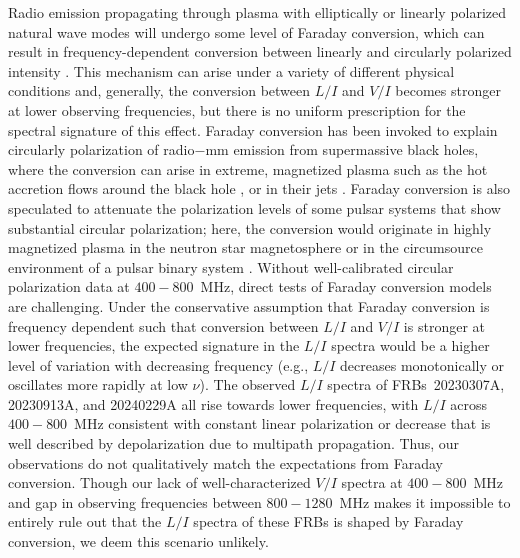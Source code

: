 \documentclass[twocolumn, linenumbers]{aastex701}
\begin{document}
Radio emission propagating through plasma with elliptically or linearly polarized natural wave modes will undergo some level of Faraday conversion, which can result in frequency-dependent conversion between linearly and circularly polarized intensity \citep{1969SvA....13..396S, 1998PASA...15..211K}. This mechanism can arise under a variety of different physical conditions \citep[e.g.,][]{2010ApJ...725.1600M, 2019ApJ...876...74G, 2019MNRAS.485L..78V, 2022ApJ...933L...6L} and, generally, the conversion between $L/I$ and $V/I$ becomes stronger at lower observing frequencies, but there is no uniform prescription for the spectral signature of this effect. Faraday conversion has been invoked to explain circularly polarization of radio$-$mm emission from supermassive black holes, where the conversion can arise in extreme, magnetized plasma such as the hot accretion flows around the black hole \citep[e.g., in Sgr A*;][]{2011MNRAS.416.2574H}, or in their jets \citep[][]{2003Ap&SS.288..143W, 2018ApJ...862...58M}. Faraday conversion is also speculated to attenuate the polarization levels of some pulsar systems that show substantial circular polarization; here, the conversion would originate in highly magnetized plasma in the neutron star magnetosphere \citep{2004A&A...421..681E, 2019MNRAS.483.2778I, 2024NatAs...8..606L} or in the circumsource environment of a pulsar binary system \citep{2023Natur.618..484L}. Without well-calibrated circular polarization data at $400-800$~MHz, direct tests of Faraday conversion models are challenging. Under the conservative assumption that Faraday conversion is frequency dependent such that conversion between $L/I$ and $V/I$ is stronger at lower frequencies, the expected signature in the $L/I$ spectra would be a higher level of variation with decreasing frequency (e.g., $L/I$ decreases monotonically or oscillates more rapidly at low $\nu$). The observed $L/I$ spectra of FRBs~20230307A, 20230913A, and 20240229A all rise towards lower frequencies, with $L/I$ across $400-800$~MHz consistent with constant linear polarization or decrease that is well described by depolarization due to multipath propagation. Thus, our observations do not qualitatively match the expectations from Faraday conversion. Though our lack of well-characterized $V/I$ spectra at $400-800$~MHz and gap in observing frequencies between $800-1280$~MHz makes it impossible to entirely rule out that the $L/I$ spectra of these FRBs is shaped by Faraday conversion, we deem this scenario unlikely.
\end{document}
